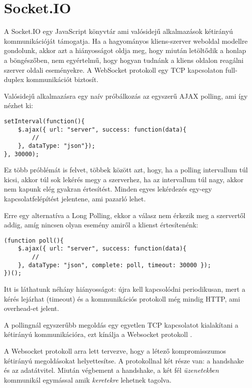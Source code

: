 \section{Socket.IO}
A Socket.IO egy JavaScript könyvtár ami valósidejű alkalmazások kétirányú kommunikációját támogatja. Ha a hagyományos kliens-szerver weboldal modellre gondolunk, akkor azt a hiányosságot oldja meg, hogy miután letöltődik a honlap a böngészőben, nem egyértelmű, hogy hogyan tudnánk a kliens oldalon reagálni szerver oldali eseményekre. A WebSocket protokoll egy TCP kapcsolaton full-duplex kommunikációt biztosít.

Valósidejű alkalmazásra egy naív próbálkozás az egyszerű AJAX polling, ami így nézhet ki:
\medskip
\begin{lstlisting}[caption=Egyszerű polling]
setInterval(function(){
    $.ajax({ url: "server", success: function(data){
        //
    }, dataType: "json"});
}, 30000);
\end{lstlisting}

Ez több próblémát is felvet, többek között azt, hogy, ha a polling intervallum túl kicsi, akkor túl sok lekérés megy a szerverhez, ha az intervallum túl nagy, akkor nem kapunk elég gyakran értesítést. Minden egyes lekérdezés egy-egy kapcsolatfelépítést jelentene, ami pazarló lehet.

Erre egy alternatíva a Long Polling, ekkor a válasz nem érkezik meg a szervertől addig, amíg nincsen olyan esemény amiről a klienst értesítenénk:

\begin{lstlisting}[caption=Long Polling]
(function poll(){
    $.ajax({ url: "server", success: function(data){
        // 
    }, dataType: "json", complete: poll, timeout: 30000 });
})();
\end{lstlisting}

Itt is láthatunk néhány hiányosságot: újra kell kapcsolódni periodikusan, mert a kérés lejárhat (timeout) és a kommunikációs protokoll még mindig HTTP, ami overhead-et jelent.


A pollingnál egyszerűbb megoldás egy egyetlen TCP kapcsolatot kialakítani a kétirányú kommunikációra, ezt kínálja a Websocket protokoll
\cite{rfc6455}.

A Websocket protokoll arra lett tervezve, hogy a létező kompromisszumos kétirányú megoldásokat helyettesítse. A protokollnal két része van: a handshake és az adatátvitel. Miután végbement a handshake, a két fél \emph{üzenetekben} kommunikál egymással amik \emph{keretekre} lehetnek tagolva.

